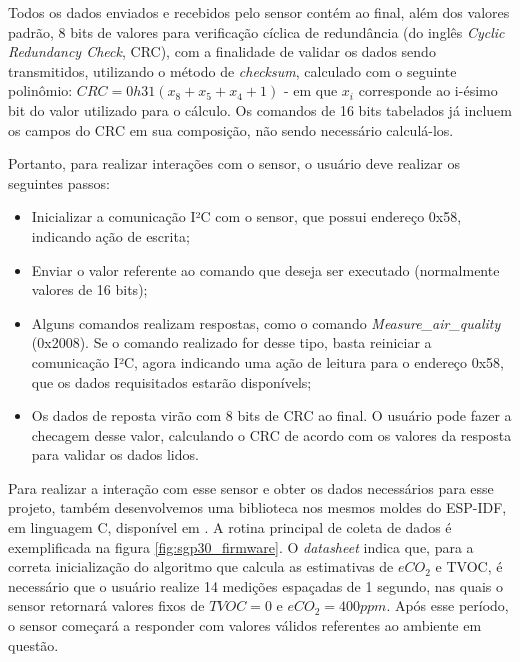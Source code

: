 \documentclass[../monografia.tex]{subfiles}
\begin{document}
Todos os dados enviados e recebidos pelo sensor contém ao final, além dos valores padrão, 8 bits de valores para verificação cíclica de redundância (do inglês \textit{Cyclic Redundancy Check}, CRC), com a finalidade de validar os dados sendo transmitidos, utilizando o método de \textit{checksum}, calculado com o seguinte polinômio: $CRC = 0h31 (x_{8} + x_{5} + x_{4} + 1)$ - em que $x_{i}$ corresponde ao i-ésimo bit do valor utilizado para o cálculo. Os comandos de 16 bits tabelados já incluem os campos do CRC em sua composição, não sendo necessário calculá-los.

Portanto, para realizar interações com o sensor, o usuário deve realizar os seguintes passos:

\begin{itemize}
	\item Inicializar a comunicação I²C com o sensor, que possui endereço 0x58, indicando ação de escrita;
	\item Enviar o valor referente ao comando que deseja ser executado (normalmente valores de 16 bits);
	\item Alguns comandos realizam respostas, como o comando \textit{Measure\_air\_quality} (0x2008). Se o comando realizado for desse tipo, basta reiniciar a comunicação I²C, agora indicando uma ação de leitura para o endereço 0x58, que os dados requisitados estarão disponívels;
	\item Os dados de reposta virão com 8 bits de CRC ao final. O usuário pode fazer a checagem desse valor, calculando o CRC de acordo com os valores da resposta para validar os dados lidos.
\end{itemize}


Para realizar a interação com esse sensor e obter os dados necessários para esse projeto, também desenvolvemos uma biblioteca nos mesmos moldes do ESP-IDF, em linguagem C, disponível em \cite{sgp30-lib}. A rotina principal de coleta de dados é exemplificada na figura \ref{fig:sgp30_firmware}. O \textit{datasheet} indica que, para a correta inicialização do algoritmo que calcula as estimativas de $eCO_{2}$ e TVOC, é necessário que o usuário realize 14 medições espaçadas de 1 segundo, nas quais o sensor retornará valores fixos de $TVOC = 0$ e $eCO_{2} = 400 ppm$. Após esse período, o sensor começará a responder com valores válidos referentes ao ambiente em questão.
\end{document}
